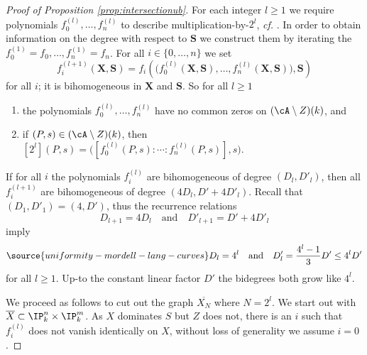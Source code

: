 \begin{proof}[Proof of Proposition \ref{prop:intersectionub}]
For each integer $l\ge 1$ we require polynomials
$f^{(l)}_0,\ldots,f^{(l)}_n$ to describe multiplication-by-$2^l$,
\textit{cf.} \cite[$\mathsection$9]{GaoHab}. In order to obtain information on the
degree with respect to $\mathbf{S}$ we construct them by iterating
the $f^{(1)}_0=f_0,\ldots,f^{(1)}_n=f_n$.
For all $i\in \{0,\ldots,n\}$  we set
\begin{equation*}
  f^{(l+1)}_i(\mathbf{X},\mathbf{S}) = f_i\left(\bigl(f^{(l)}_0(\mathbf{X},\mathbf{S}),\ldots,f^{(l)}_n(\mathbf{X},\mathbf{S})\bigr),\mathbf{S}\right)
\end{equation*}
 for all $i$; it is bihomogeneous in
$\mathbf{X}$ and $\mathbf{S}$.
So for all $l\ge 1$
\begin{enumerate}
 \item [(i)] the polynomials $f^{(l)}_0,\ldots,f^{(l)}_n$ have no common zeros on
 $(\cA\setminus Z)(k)$, and
 \item[(ii)]  if   $(P,s)\in(\cA\setminus Z)(k)$, then $[2^l](P,s) = \bigl([f^{(l)}_0(P,s):\cdots : f^{(l)}_n(P,s)],s\bigr)$.
\end{enumerate}


If for all $i$ the polynomials $f^{(l)}_i$ are bihomogeneous of degree
$(D_{l},D'_{l})$, then all $f^{(l+1)}_i$ are bihomogeneous of degree
$(4D_{l},D'+4D'_{l})$. Recall that
$(D_1,D'_1)=(4,D')$, thus the recurrence
relations
$$ D_{l+1}=4D_l  \quad\text{and}\quad D'_{l+1} = D' + 4D'_{l} $$
imply
\begin{equation}
  \label{eq:DlprimeDlbound}
\source{uniformity-mordell-lang-curves}
  D_l = 4^l \quad\text{and}\quad   D'_l = \frac{4^l-1}{3}D'\le 4^lD'
\end{equation}
for all $l\ge 1$.
Up-to the constant linear factor $D'$ the bidegrees both
grow like $4^l$.


We proceed as follows to cut out the graph $\overline{X_{N}}$ where
$N=2^l$.
We start out with $\overline X\subset\IP_k^n\times\IP_k^m$.
As $X$ dominates $S$ but $Z$ does not, there is an $i$ such that
$f_i^{(l)}$  does not
vanish identically on $X$, without loss of generality we assume $i=0$.



\end{proof}
